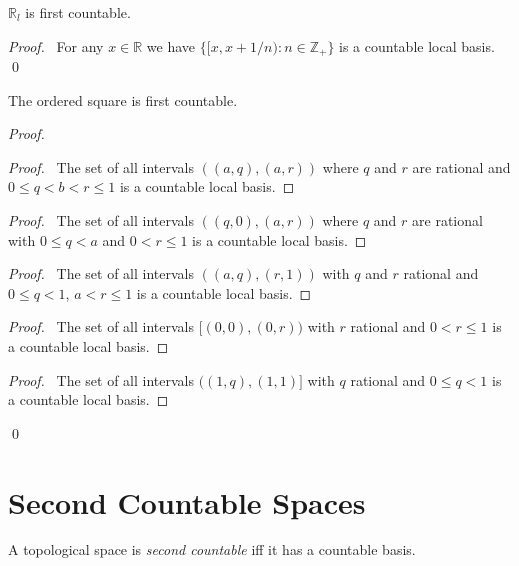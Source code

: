 \begin{prop}
$\mathbb{R}_l$ is first countable.
\end{prop}

\begin{proof}
\pf\ For any $x \in \mathbb{R}$ we have $\{ [x, x + 1/n) : n \in \mathbb{Z}_+ \}$ is a countable local basis. \qed
\end{proof}

\begin{prop}
The ordered square is first countable.
\end{prop}

\begin{proof}
\pf
{}
\begin{proof}
	\pf\ The set of all intervals $((a,q),(a,r))$ where $q$ and $r$ are rational and $0 \leq q < b < r \leq 1$ is a countable local basis.
\end{proof}
\begin{proof}
	\pf\ The set of all intervals $((q,0),(a,r))$ where $q$ and $r$ are rational with $0 \leq q < a$ and $0 < r \leq 1$ is a countable local basis.
\end{proof}
\begin{proof}
	\pf\ The set of all intervals $((a,q),(r,1))$ with $q$ and $r$ rational and $0 \leq q < 1$, $a < r \leq 1$ is a countable local basis.
\end{proof}
\begin{proof}
	\pf\ The set of all intervals $[(0,0),(0,r))$ with $r$ rational and $0 < r \leq 1$ is a countable local basis.
\end{proof}
\begin{proof}
	\pf\ The set of all intervals $((1,q),(1,1)]$ with $q$ rational and $0 \leq q < 1$ is a countable local basis.
\end{proof}
\qed
\end{proof}
\section{Second Countable Spaces}

\begin{df}
A topological space is \emph{second countable} iff it has a countable basis.
\end{df}


